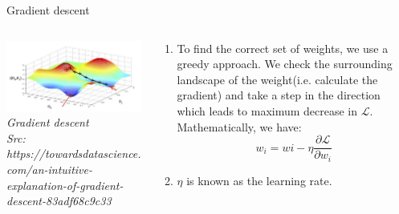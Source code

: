 \begin{frame}{Gradient descent}
  \begin{columns}[T]
  \begin{column}{0.4\textwidth}
    \includegraphics[width=\textwidth]{images/grad-desc.png}
    \tiny{\textit{Gradient descent\\ Src: https://towardsdatascience.com/an-intuitive-explanation-of-gradient-descent-83adf68c9c33}}
  \end{column}
  \begin{column}{0.6\textwidth}
  \begin{enumerate}[$\bullet$]
  \item To find the correct set of weights, we use a greedy approach. We check the surrounding landscape of the weight(i.e. calculate the gradient) and take a step in the direction which leads to maximum decrease in $\mathcal L$. Mathematically, we have:
  $$w_i=wi-\eta \frac{\partial \mathcal L}{\partial w_i}$$\pause
  \item $\eta$ is known as the learning rate.
  \end{enumerate}
  \end{column}
\end{columns}
\end{frame}


